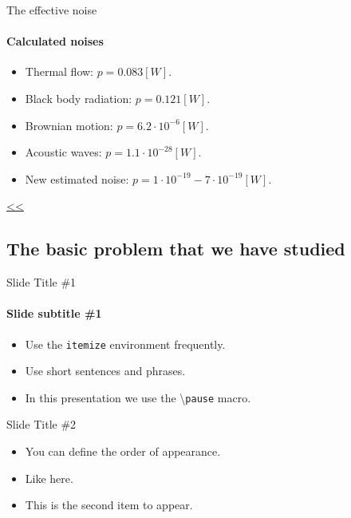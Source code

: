 \documentclass{beamer}
\begin{document}
\begin{frame}{\hypertarget{frame:The effective noise 1}{The effective noise}}
	\framesubtitle{Calculated noises}
	\begin{itemize}	
		\item Thermal flow: $p=0.083[W]$.
		\item Black body radiation: $p=0.121[W]$.
		\item Brownian motion: $p=6.2\cdot 10^{-6}[W]$.
		\item Acoustic waves: $p=1.1\cdot 10^{-28}[W]$.
		\item New estimated noise: $p=1\cdot 10^{-19} - 7\cdot 10^{-19}[W]$.
					
	\end{itemize}
	\hyperlink{frame:The effective noise}{<<} 
\end{frame}















\iffalse

\subsection[Basic Problem]{The basic problem that we have studied}

\begin{frame}{Slide Title \#1}
	\framesubtitle{Slide subtitle \#1}
	\begin{itemize}
		\item Use the \texttt{itemize} environment frequently.
		\pause
		\item Use short sentences and phrases.
		\pause
		\item In this presentation we use the \textbackslash{}\texttt{pause} macro.
	\end{itemize}
\end{frame}

\begin{frame}{Slide Title \#2}
	\begin{itemize}
		\item <1->You can define the order of appearance.
		\item <3->Like here.
		\item <2->This is the second item to appear.
	\end{itemize}
\end{frame}
\end{document}
